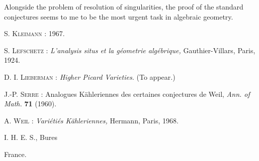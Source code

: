 Alongside the problem of resolution of singularities, the proof of the standard conjectures seems to me to be the most urgent task in algebraic geometry.

\begin{thebibliography}{99}
 \textsc{S. Kleimann :} 1967.

 \textsc{S. Lefschetz :} {\em L'analysis situs et la g\'eometrie alg\'ebrique,} Gauthier-Villars, Paris, 1924.

 \textsc{D. I. Lieberman :} {\em Higher Picard Varieties.} (To appear.)

 \textsc{J.-P. Serre :} Analogues K\"ahleriennes des certaines conjectures de Weil, {\em Ann. of Math.} {\bf 71} (1960).

 \textsc{A. Weil :} {\em Vari\'eti\'es K\"ahleriennes,} Hermann, Paris, 1968.
\end{thebibliography}

\bigskip

\noindent
I. H. E. S., Bures

\noindent
France.
